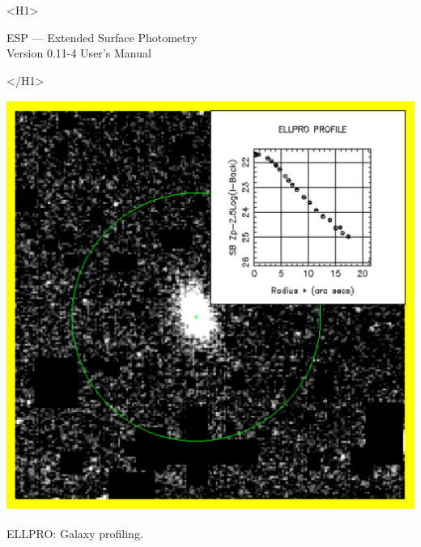 \documentclass[twoside,11pt]{article}
\newcommand{\stardoctitle}     {ESP --- Extended Surface Photometry}
\newcommand{\stardocversion}   {Version 0.11-4}	%
\newcommand{\stardocmanual}    {User's Manual}
\newcommand{\xlabel}[1]{}
\begin{document}
\begin{htmlonly}
   \xlabel{}
   \begin{rawhtml} <H1> \end{rawhtml}
      \stardoctitle\\
      \stardocversion
      \stardocmanual
   \begin{rawhtml} </H1> \end{rawhtml}

   \includegraphics{sun180_diag3}

   \begin{center}
   ELLPRO: Galaxy profiling.
   \end{center}


\end{htmlonly}
\end{document}

